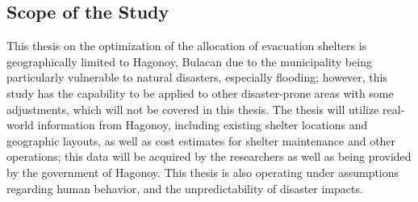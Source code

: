 \documentclass[english,12pt,a4paper]{article}
\begin{document}
		\subsection*{Scope of the Study}
			This thesis on the optimization of the allocation of evacuation shelters is geographically limited to Hagonoy, Bulacan due to the municipality being particularly vulnerable to natural disasters, especially flooding; however, this study has the capability to be applied to other disaster-prone areas with some adjustments, which will not be covered in this thesis. The thesis will utilize real-world information from Hagonoy, including existing shelter locations and geographic layouts, as well as cost estimates for shelter maintenance and other operations; this data will be acquired by the researchers as well as being provided by the government of Hagonoy. This thesis is also operating under assumptions regarding human behavior, and the unpredictability of disaster impacts.
	
	
\end{document}
